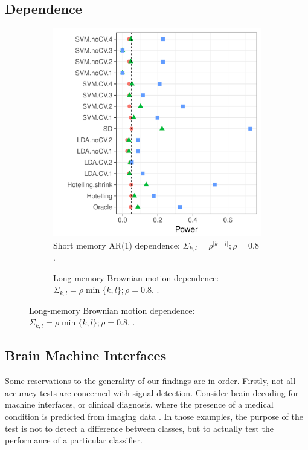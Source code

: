 \documentclass[12pt,a4paper]{article}
\begin{document}
\subsection{Dependence}

\begin{figure}[h]
	\centering
	\caption{\mycaption}	
	\begin{subfigure}{.4\textwidth}
	\centering
	\includegraphics[width=1\linewidth]{"art/file11"}
	\caption{Short memory AR(1) dependence: $\Sigma_{k,l}=\rho^{|k-l|}; \rho=0.8$. } 
	\label{fig:ar_1}
	\end{subfigure}
	\begin{subfigure}{.4\textwidth}
	\centering
	\caption{Long-memory Brownian motion dependence: $\Sigma_{k,l}=\rho \min\{k,l\}; \rho=0.8$. .} 
	\label{fig:pink_noise}
	\end{subfigure}
\end{figure}




\subsection{Brain Machine Interfaces}
\label{sec:reservations}

Some reservations to the generality of our findings are in order. 
Firstly, not all accuracy tests are concerned with signal detection.
Consider brain decoding for machine interfaces, or clinical diagnosis, where the presence of a medical condition is predicted from imaging data \citep[e.g.][]{olivetti_induction_2012,wager_fmri-based_2013}. 
In those examples, the purpose of the test is not to detect a difference between classes, but to actually test the performance of a particular classifier.  
\end{document}
